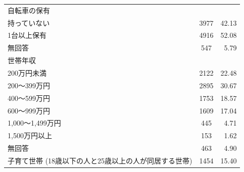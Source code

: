 \documentclass[a4paper,12pt, uplatex]{jsbook}
\begin{document}
\begin{table}[h]
\begin{tabular}{lcr}
        自転車の保有 & & \\
        \hspace{1em} 持っていない & 3977 & 42.13 \\
        \hspace{1em} 1台以上保有 & 4916 & 52.08 \\
        \hspace{1em} 無回答 & 547 & 5.79 \\

        世帯年収 & & \\
        \hspace{1em} 200万円未満 & 2122 &	22.48 \\
        \hspace{1em} 200～399万円 & 2895	& 30.67 \\
        \hspace{1em} 400～599万円 & 1753	& 18.57 \\
        \hspace{1em} 600～999万円 & 1609	& 17.04 \\
        \hspace{1em} 1,000～1,499万円 & 445	& 4.71 \\
        \hspace{1em} 1,500万円以上 & 153	& 1.62 \\
        \hspace{1em} 無回答 & 463	& 4.90 \\

        子育て世帯 (18歳以下の人と25歳以上の人が同居する世帯) & 1454 & 15.40 \\

  \bottomrule
    \end{tabular}
    \label{tab:世帯データ概要}
\end{table}
\end{document}

